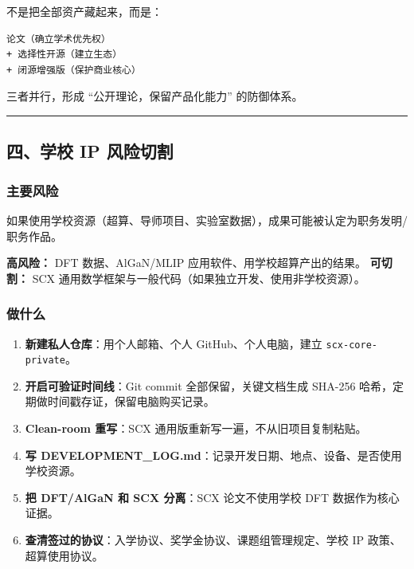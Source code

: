 \documentclass[
  12pt,
]{ctexart}
\providecommand{\tightlist}{%
  \setlength{\itemsep}{0pt}\setlength{\parskip}{0pt}}
\begin{document}
不是把全部资产藏起来，而是：

\begin{verbatim}
论文（确立学术优先权）
+ 选择性开源（建立生态）
+ 闭源增强版（保护商业核心）
\end{verbatim}

三者并行，形成 ``公开理论，保留产品化能力'' 的防御体系。

\begin{center}\rule{0.5\linewidth}{0.5pt}\end{center}

\subsection{四、学校 IP
风险切割}\label{ux56dbux5b66ux6821-ip-ux98ceux9669ux5207ux5272}

\subsubsection{主要风险}\label{ux4e3bux8981ux98ceux9669}

如果使用学校资源（超算、导师项目、实验室数据），成果可能被认定为职务发明/职务作品。

\textbf{高风险：} DFT 数据、AlGaN/MLIP 应用软件、用学校超算产出的结果。
\textbf{可切割：} SCX
通用数学框架与一般代码（如果独立开发、使用非学校资源）。

\subsubsection{做什么}\label{ux505aux4ec0ux4e48-1}

\begin{enumerate}
\def\labelenumi{\arabic{enumi}.}
\tightlist
\item
  \textbf{新建私人仓库}：用个人邮箱、个人 GitHub、个人电脑，建立
  \texttt{scx-core-private}。
\item
  \textbf{开启可验证时间线}：Git commit 全部保留，关键文档生成 SHA-256
  哈希，定期做时间戳存证，保留电脑购买记录。
\item
  \textbf{Clean-room 重写}：SCX 通用版重新写一遍，不从旧项目复制粘贴。
\item
  \textbf{写
  DEVELOPMENT\_LOG.md}：记录开发日期、地点、设备、是否使用学校资源。
\item
  \textbf{把 DFT/AlGaN 和 SCX 分离}：SCX 论文不使用学校 DFT
  数据作为核心证据。
\item
  \textbf{查清签过的协议}：入学协议、奖学金协议、课题组管理规定、学校 IP
  政策、超算使用协议。
\end{enumerate}
\end{document}
